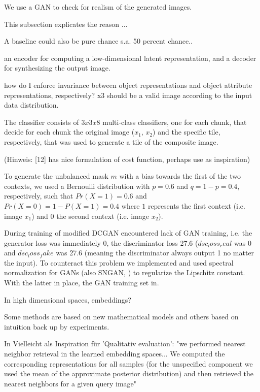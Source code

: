 \documentclass[10pt,letterpaper]{article}
\begin{document}
\par We use a GAN to check for realism of the generated images.

\par This subsection explicates the reason ...

\par A baseline could also be pure chance s.a. 50 percent chance..

\par an encoder for computing a low-dimensional latent representation, and a decoder for synthesizing the output image.

how do I enforce invariance between object representations and object attribute representations, respectively?
x3 should be a valid image according to the input data distribution.

The classifier consists of $3x3x8$ multi-class classifiers, one for each chunk, that decide for each chunk the original image ($x_1$, $x_2$) and the specific tile, respectively, that was used to generate a tile of the composite image.

(Hinweis: [12] has nice formulation of cost function, perhaps use as inspiration)

\par To generate the unbalanced mask $m$ with a bias towards the first of the two contexts, we used a Bernoulli distribution with $p=0.6$ and $q=1-p=0.4$, respectively, such that $Pr(X=1)=0.6$ and $Pr(X=0)=1-P(X=1)=0.4$ where $1$ represents the first context (i.e. image $x_1$) and $0$ the second context (i.e. image $x_2$).

\par During training of modified DCGAN encountered lack of GAN training, i.e. the generator loss was immediately 0, the discriminator loss 27.6 ($dsc_loss_real$ was 0 and $dsc_loss_fake$ was 27.6 (meaning the discriminator always output 1 no matter the input). To counteract this problem we implemented and used spectral normalization for GANs (also SNGAN, \cite{1802.05957}) to regularize the Lipschitz constant. With the latter in place, the GAN training set in.

\par In high dimensional spaces, embeddings?

\par Some methods are based on new mathematical models and others based on intuition back up by experiments.

\par In \cite{1611.03383} Vielleicht als Inspiration für 'Qualitativ evaluation': "we performed nearest neighbor retrieval in the learned embedding spaces... We computed the corresponding representations for all samples (for the unspecified component we used the mean of the approximate posterior distribution) and then retrieved the nearest neighbors for a given query image"
\end{document}

